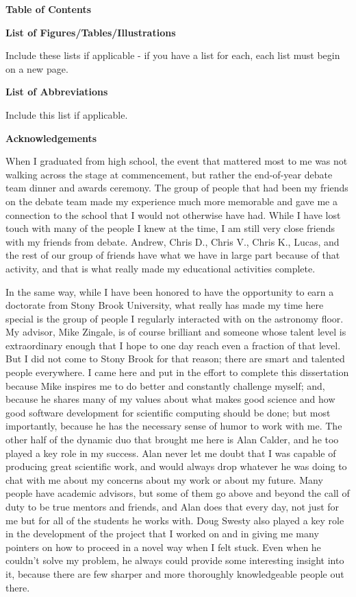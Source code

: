 \documentclass[12pt]{article}
\begin{document}
\newpage
\centerline{\bf{Table of Contents}}
\renewcommand*\contentsname{}
\tableofcontents

\newpage
\centerline{\bf{List of Figures/Tables/Illustrations}}
\vspace*{4\baselineskip}
Include these lists if applicable - if you have a list for each, each list must begin on a new page.

\newpage
\centerline{\bf{List of Abbreviations}}
\vspace*{4\baselineskip}
Include this list if applicable.

\newpage
\centerline{\bf{Acknowledgements}}
\vspace*{4\baselineskip}
When I graduated from high school, the event that mattered most to me was 
not walking across the stage at commencement, but rather the end-of-year 
debate team dinner and awards ceremony. The group of people that had been
my friends on the debate team made my experience much more memorable and 
gave me a connection to the school that I would not otherwise have had.
While I have lost touch with many of the people I knew at the time, I am 
still very close friends with my friends from debate. Andrew, Chris D.,
Chris V., Chris K., Lucas, and the rest of our group of friends have 
what we have in large part because of that activity, and that is what 
really made my educational activities complete.

In the same way, while I have been honored to have the opportunity to 
earn a doctorate from Stony Brook University, what really has made my 
time here special is the group of people I regularly interacted with 
on the astronomy floor. My advisor, Mike Zingale, is of course brilliant 
and someone whose talent level is extraordinary enough that I hope to 
one day reach even a fraction of that level. But I did not come to Stony 
Brook for that reason; there are smart and talented people everywhere. 
I came here and put in the effort to complete this dissertation because 
Mike inspires me to do better and constantly challenge myself;
and, because he shares many of my values about what makes good science and 
how good software development for scientific computing should be done;
but most importantly, because he has the necessary sense of humor to work 
with me. The other half of the dynamic duo that brought me here is Alan 
Calder, and he too played a key role in my success. Alan never let me 
doubt that I was capable of producing great scientific work, and would 
always drop whatever he was doing to chat with me about my concerns about 
my work or about my future. Many people have academic advisors, but some 
of them go above and beyond the call of duty to be true mentors and friends,
and Alan does that every day, not just for me but for all of the students 
he works with. Doug Swesty also played a key role in the development of the 
project that I worked on and in giving me many pointers on how to proceed 
in a novel way when I felt stuck. Even when he couldn't solve my problem, 
he always could provide some interesting insight into it, because there 
are few sharper and more thoroughly knowledgeable people out there.
\end{document}
